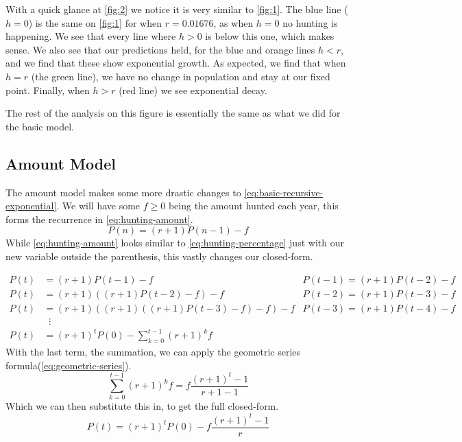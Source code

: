 \documentclass{article}
\begin{document}
With a quick glance at \cref{fig:2} we notice it is very similar to \cref{fig:1}. The blue line ($h=0$) is the same on \cref{fig:1} for when $r=0.01676$, as when $h=0$ no hunting is happening. We see that every line where $h > 0$ is below this one, which makes sense. We also see that our predictions held, for the blue and orange lines $h < r$, and we find that these show exponential growth. As expected, we find that when $h=r$ (the green line), we have no change in population and stay at our fixed point. Finally, when $h > r$ (red line) we see exponential decay.

The rest of the analysis on this figure is essentially the same as what we did for the basic model.

\subsection{Amount Model}
The amount model makes some more drastic changes to \cref{eq:basic-recursive-exponential}. We will have some $f \ge 0$ being the amount hunted each year, this forms the recurrence in \cref{eq:hunting-amount}.
\begin{equation}\label{eq:hunting-amount}
    P(n) = (r+1)P(n-1) - f
\end{equation}
While \cref{eq:hunting-amount} looks similar to \cref{eq:hunting-percentage} just with our new variable outside the parenthesis, this vastly changes our closed-form.

\begin{align*}
    P(t) &= (r+1)P(t-1) - f & P(t-1) = (r+1)P(t-2) - f \\
    P(t) &= (r+1)((r+1)P(t-2) - f) - f & P(t-2) = (r+1)P(t-3) - f \\
    P(t) &= (r+1)((r+1)((r+1)P(t-3) - f) - f) - f & P(t-3) = (r+1)P(t-4) - f \\
    &\phantom{x}\vdots \\
    P(t) &= (r+1)^tP(0) - \sum_{k=0}^{t-1}(r+1)^kf
\end{align*}
With the last term, the summation, we can apply the geometric series formula(\cref{eq:geometric-series}).
\begin{equation*}
    \sum_{k=0}^{t-1}(r+1)^kf = f\frac{(r+1)^t-1}{r+1-1}
\end{equation*}
Which we can then substitute this in, to get the full closed-form.
\begin{equation}\label{eq:hunting-amount-closed}
     P(t) = (r+1)^tP(0)-f\frac{(r+1)^t-1}{r}
\end{equation}
\end{document}
